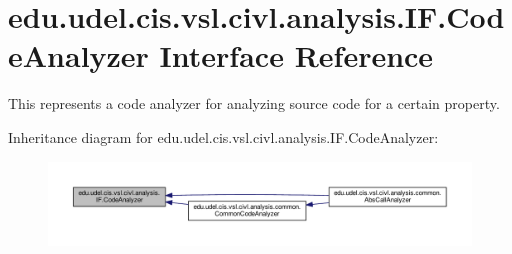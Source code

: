 \hypertarget{interfaceedu_1_1udel_1_1cis_1_1vsl_1_1civl_1_1analysis_1_1IF_1_1CodeAnalyzer}{}\section{edu.\+udel.\+cis.\+vsl.\+civl.\+analysis.\+I\+F.\+Code\+Analyzer Interface Reference}
\label{interfaceedu_1_1udel_1_1cis_1_1vsl_1_1civl_1_1analysis_1_1IF_1_1CodeAnalyzer}


This represents a code analyzer for analyzing source code for a certain property.  




Inheritance diagram for edu.\+udel.\+cis.\+vsl.\+civl.\+analysis.\+I\+F.\+Code\+Analyzer\+:
\nopagebreak
\begin{figure}[H]
\begin{center}
\leavevmode
\includegraphics[width=350pt]{interfaceedu_1_1udel_1_1cis_1_1vsl_1_1civl_1_1analysis_1_1IF_1_1CodeAnalyzer__inherit__graph}
\end{center}
\end{figure}

